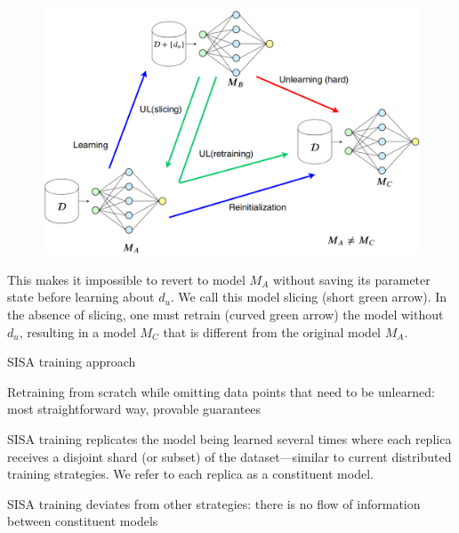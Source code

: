 \documentclass[12pt,aspectratio=169,handout]{beamer}
\begin{document}
\begin{frame}

\begin{figure}
\includegraphics[width=0.7\linewidth]{img/unlearning1.png}	
\end{figure}
\vspace{-1.3em}
\small{
This makes it impossible to revert to model $M_A$ without saving its parameter state before learning about $d_u$. We call this model slicing (short green arrow). In the absence of slicing, one must retrain (curved green arrow) the model without $d_u$, resulting in a model $M_C$ that is different from the original model $M_A$.
}



\end{frame}



\begin{frame}{SISA training approach}

Retraining from scratch while omitting data points that need to be unlearned: most straightforward way, provable guarantees

SISA training replicates the model being learned several times where each replica receives a disjoint shard (or subset) of the dataset—similar to current distributed training strategies. We refer to each replica as a constituent model.

SISA training deviates from other strategies: there is no flow of information between constituent models



\end{frame}
\end{document}

